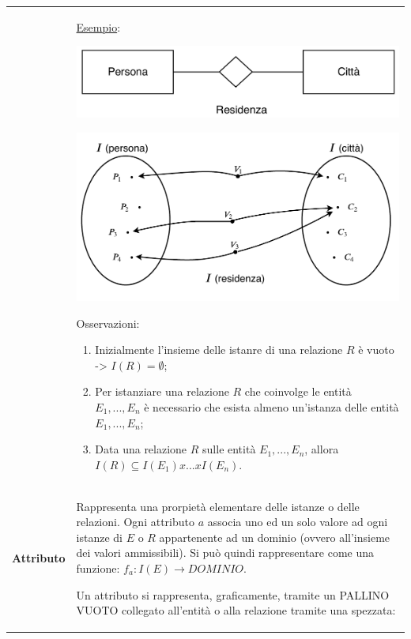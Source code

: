 \documentclass[a4paper, 10pt]{report}
\begin{document}
\begin{longtable}{| p{} | p{} |} 
 & \underline{Esempio}:

\begin{center}
\includegraphics[scale=0.40]{immagine7.pdf}

\includegraphics[scale=0.40]{immagine8.pdf}
\end{center}

Osservazioni:
\begin{enumerate}
\item Inizialmente l'insieme delle istanre di una relazione $R$ è vuoto -> $I(R) = \emptyset$;
\item Per istanziare una relazione $R$ che coinvolge le entità $E_1,..., E_n$ è necessario che esista almeno un'istanza delle entità $E_1,..., E_n$;
\item Data una relazione $R$ sulle entità $E_1,..., E_n$, allora $I(R) \subseteq I(E_1) x ... x I(E_n)$.
\end{enumerate}\\

\textbf{Attributo} & Rappresenta una prorpietà elementare delle istanze o delle relazioni. Ogni attributo $a$ associa uno ed un solo valore ad ogni istanze di $E$ o $R$ appartenente ad un dominio (ovvero all'insieme dei valori ammissibili). Si può quindi rappresentare come una funzione: $f_a : I(E) \rightarrow DOMINIO$.

Un attributo si rappresenta, graficamente, tramite un PALLINO VUOTO collegato all'entità o alla relazione tramite una spezzata:


\end{longtable}
\end{document}
